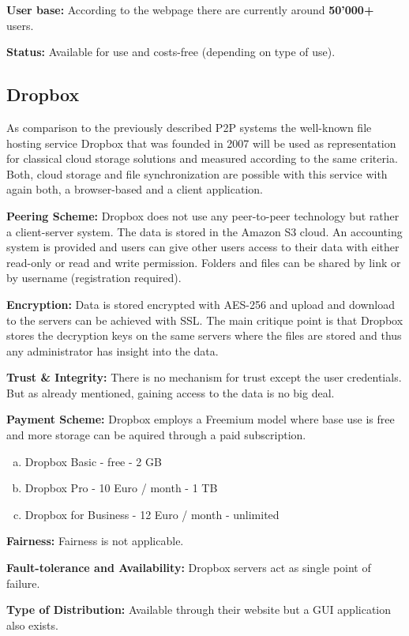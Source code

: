 \textbf{User base:} According to the webpage \cite{aerofs} there are currently around \textbf{50'000\textsc{+}} users.

\textbf{Status:} Available for use and costs-free (depending on type of use).

\subsection{Dropbox}
As comparison to the previously described P2P systems the well-known file hosting service Dropbox that was founded in 2007 will be used as representation for classical cloud storage solutions and measured according to the same criteria. Both, cloud storage and file synchronization are possible with this service with again both, a browser-based and a client application.

\textbf{Peering Scheme:} Dropbox does not use any peer-to-peer technology but rather a client-server system. The data is stored in the Amazon S3 cloud. An accounting system is provided and users can give other users access to their data with either read-only or read and write permission. Folders and files can be shared by link or by username (registration required).

\textbf{Encryption:} Data is stored encrypted with AES-256 and upload and download to the servers can be achieved with SSL. The main critique point is that Dropbox stores the decryption keys on the same servers where the files are stored and thus any administrator has insight into the data.

\textbf{Trust \& Integrity:} There is no mechanism for trust except the user credentials. But as already mentioned, gaining access to the data is no big deal.

\textbf{Payment Scheme:} Dropbox employs a Freemium model where base use is free and more storage can be aquired through a paid subscription.
\begin{enumerate}[(a)]
	\item Dropbox Basic - free - 2 GB
	\item Dropbox Pro - 10 Euro / month - 1 TB
	\item Dropbox for Business - 12 Euro / month - unlimited
\end{enumerate}

\textbf{Fairness:} Fairness is not applicable.

\textbf{Fault-tolerance and Availability:} Dropbox servers act as single point of failure.

\textbf{Type of Distribution:} Available through their website but a GUI application also exists.

